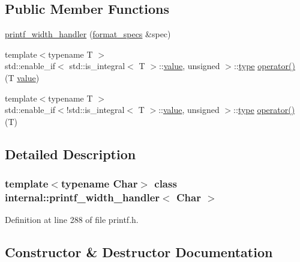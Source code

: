 \subsection*{Public Member Functions}
\begin{DoxyCompactItemize}
\item 
\hyperlink{classinternal_1_1printf__width__handler_a994eefddca13ca9961eb7924275dc34c}{printf\+\_\+width\+\_\+handler} (\hyperlink{structbasic__format__specs}{format\+\_\+specs} \&spec)
\item 
{\footnotesize template$<$typename T $>$ }\\std\+::enable\+\_\+if$<$ std\+::is\+\_\+integral$<$ T $>$\+::\hyperlink{classinternal_1_1value}{value}, unsigned $>$\+::\hyperlink{namespaceinternal_a8661864098ac0acff9a6dd7e66f59038}{type} \hyperlink{classinternal_1_1printf__width__handler_a5d2d31824dda4ca908be49b6c673a965}{operator()} (T \hyperlink{classinternal_1_1value}{value})
\item 
{\footnotesize template$<$typename T $>$ }\\std\+::enable\+\_\+if$<$!std\+::is\+\_\+integral$<$ T $>$\+::\hyperlink{classinternal_1_1value}{value}, unsigned $>$\+::\hyperlink{namespaceinternal_a8661864098ac0acff9a6dd7e66f59038}{type} \hyperlink{classinternal_1_1printf__width__handler_a8073d9a0c8acb3fade46decf3bf484f9}{operator()} (T)
\end{DoxyCompactItemize}


\subsection{Detailed Description}
\subsubsection*{template$<$typename Char$>$\newline
class internal\+::printf\+\_\+width\+\_\+handler$<$ Char $>$}



Definition at line 288 of file printf.\+h.



\subsection{Constructor \& Destructor Documentation}
\mbox{\label{classinternal_1_1printf__width__handler_a994eefddca13ca9961eb7924275dc34c}} 

